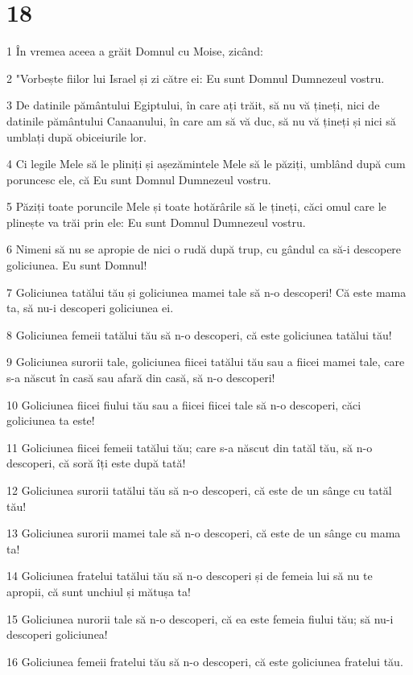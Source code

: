 \chapter{18}

\par 1 În vremea aceea a grăit Domnul cu Moise, zicând:
\par 2 "Vorbește fiilor lui Israel și zi către ei: Eu sunt Domnul Dumnezeul vostru.
\par 3 De datinile pământului Egiptului, în care ați trăit, să nu vă țineți, nici de datinile pământului Canaanului, în care am să vă duc, să nu vă țineți și nici să umblați după obiceiurile lor.
\par 4 Ci legile Mele să le pliniți și așezămintele Mele să le păziți, umblând după cum poruncesc ele, că Eu sunt Domnul Dumnezeul vostru.
\par 5 Păziți toate poruncile Mele și toate hotărârile să le țineți, căci omul care le plinește va trăi prin ele: Eu sunt Domnul Dumnezeul vostru.
\par 6 Nimeni să nu se apropie de nici o rudă după trup, cu gândul ca să-i descopere goliciunea. Eu sunt Domnul!
\par 7 Goliciunea tatălui tău și goliciunea mamei tale să n-o descoperi! Că este mama ta, să nu-i descoperi goliciunea ei.
\par 8 Goliciunea femeii tatălui tău să n-o descoperi, că este goliciunea tatălui tău!
\par 9 Goliciunea surorii tale, goliciunea fiicei tatălui tău sau a fiicei mamei tale, care s-a născut în casă sau afară din casă, să n-o descoperi!
\par 10 Goliciunea fiicei fiului tău sau a fiicei fiicei tale să n-o descoperi, căci goliciunea ta este!
\par 11 Goliciunea fiicei femeii tatălui tău; care s-a născut din tatăl tău, să n-o descoperi, că soră îți este după tată!
\par 12 Goliciunea surorii tatălui tău să n-o descoperi, că este de un sânge cu tatăl tău!
\par 13 Goliciunea surorii mamei tale să n-o descoperi, că este de un sânge cu mama ta!
\par 14 Goliciunea fratelui tatălui tău să n-o descoperi și de femeia lui să nu te apropii, că sunt unchiul și mătușa ta!
\par 15 Goliciunea nurorii tale să n-o descoperi, că ea este femeia fiului tău; să nu-i descoperi goliciunea!
\par 16 Goliciunea femeii fratelui tău să n-o descoperi, că este goliciunea fratelui tău.
